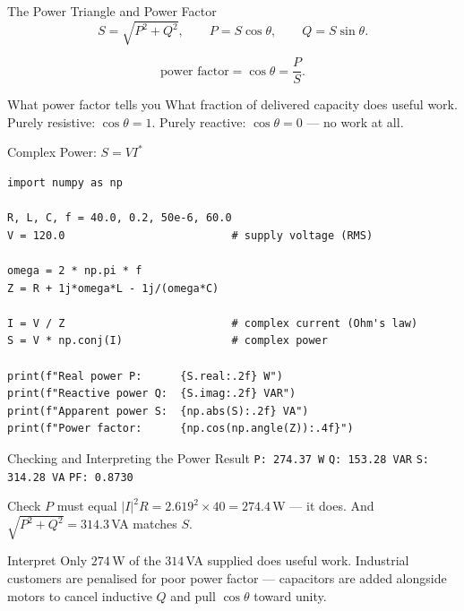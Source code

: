 \documentclass[9pt,aspectratio=169,xcolor=table]{beamer}
\begin{document}
\begin{frame}{The Power Triangle and Power Factor}
    \leavevmode
    \[
    S = \sqrt{P^{2} + Q^{2}}, \qquad P = S\cos\theta, \qquad Q = S\sin\theta.
    \]

    \vspace{2mm}
    \[
    \text{power factor} = \cos\theta = \frac{P}{S}.
    \]

    \vspace{3mm}
    \begin{block}{What power factor tells you}
        What fraction of delivered capacity does useful work. Purely
        resistive: $\cos\theta = 1$. Purely reactive: $\cos\theta = 0$
        --- no work at all.
    \end{block}
\end{frame}

\begin{frame}[fragile]{Complex Power: $S = VI^{*}$}
    \leavevmode
\begin{lstlisting}
import numpy as np

R, L, C, f = 40.0, 0.2, 50e-6, 60.0
V = 120.0                          # supply voltage (RMS)

omega = 2 * np.pi * f
Z = R + 1j*omega*L - 1j/(omega*C)

I = V / Z                          # complex current (Ohm's law)
S = V * np.conj(I)                 # complex power

print(f"Real power P:      {S.real:.2f} W")
print(f"Reactive power Q:  {S.imag:.2f} VAR")
print(f"Apparent power S:  {np.abs(S):.2f} VA")
print(f"Power factor:      {np.cos(np.angle(Z)):.4f}")
\end{lstlisting}
\end{frame}

\begin{frame}{Checking and Interpreting the Power Result}
    \leavevmode
    \texttt{P: 274.37 W} \quad \texttt{Q: 153.28 VAR} \quad
    \texttt{S: 314.28 VA} \quad \texttt{PF: 0.8730}

    \vspace{3mm}
    \begin{block}{Check}
        \small $P$ must equal $|I|^2 R = 2.619^2 \times 40 = 274.4\,$W
        --- it does. And $\sqrt{P^2+Q^2} = 314.3\,$VA matches $S$.
    \end{block}

    \vspace{2mm}
    \begin{alertblock}{Interpret}
        \small Only $274\,$W of the $314\,$VA supplied does useful
        work. Industrial customers are penalised for poor power
        factor --- capacitors are added alongside motors to cancel
        inductive $Q$ and pull $\cos\theta$ toward unity.
    \end{alertblock}
\end{frame}
\end{document}
